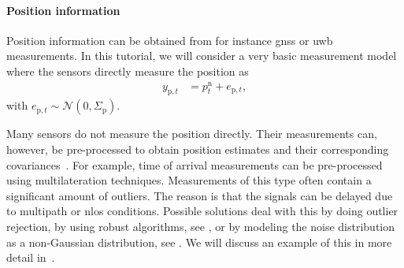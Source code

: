 \paragraph{Position information}
Position information can be obtained from for instance \gls{gnss} or \gls{uwb} measurements. In this tutorial, we will consider a very basic measurement model where the sensors directly measure the position as
\begin{align}
\label{eq:models-posMeasModel}
y_{\text{p},t} &= p_t^\text{n} + e_{\text{p},t}, 
\end{align}
with $e_{\text{p},t} \sim \mathcal{N}(0,\Sigma_\text{p})$. 

Many sensors do not measure the position directly. Their measurements can, however, be pre-processed to obtain position estimates and their corresponding covariances~\citep{gustafssonG:2005}. For example, time of arrival measurements can be pre-processed using multilateration techniques. Measurements of this type often contain a significant amount of outliers. The reason is that the signals can be delayed due to multipath or \gls{nlos} conditions. Possible solutions deal with this by doing outlier rejection, by using robust algorithms, see \eg \cite{zoubirKCM:2012}, or by modeling the noise distribution as a non-Gaussian distribution, see \eg \cite{kokHS:2015,gustafssonG:2005,nurminenAPG:2015}. We will discuss an example of this in more detail in~.

